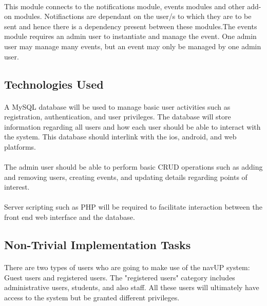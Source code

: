 \documentclass{article}
\begin{document}
\paragraph{}This module connects to the notifications module, events modules and other add-on modules. Notifiactions are dependant on the user/s to which they are to be sent and hence there is a dependency present between these modules.The events module requires an admin user to instantiate and manage the event. One admin user may manage many events, but an event may only be managed by one admin user. 

\subsection{Technologies Used}
\paragraph{}A MySQL database will be used to manage basic user activities such as registration, authentication, and user privileges. The database will store information regarding all users and how each user should be able to interact with the system. This database should interlink with the ios, android, and web platforms.

\paragraph{}The admin user should be able to perform basic CRUD operations such as adding and removing users, creating events, and updating details regarding points of interest. 

\paragraph{}Server scripting such as PHP will be required to facilitate interaction between the front end web interface and the database.

\subsection{Non-Trivial Implementation Tasks}

\paragraph{}There are two types of users who are going to make use of the navUP system: Guest users and registered users. The "registered users" category includes administrative users, students, and also staff. All these users will ultimately have access to the system but be granted different privileges.
\end{document}
